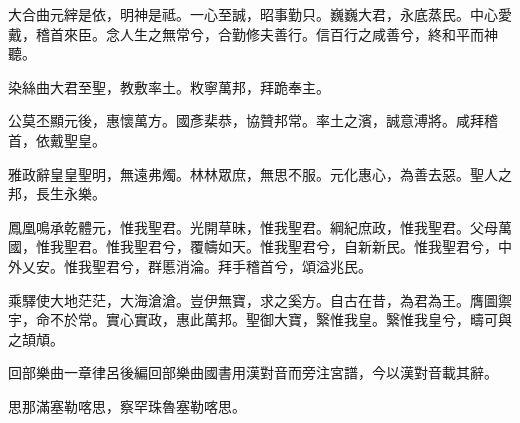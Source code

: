 \begin{pinyinscope}
大合曲元縡是依，明神是祗。一心至誠，昭事勤只。巍巍大君，永底蒸民。中心愛戴，稽首來臣。念人生之無常兮，合勤修夫善行。信百行之咸善兮，終和平而神聽。

染絲曲大君至聖，教敷率土。敉寧萬邦，拜跪奉主。

公莫丕顯元後，惠懷萬方。國彥棐恭，協贊邦常。率土之濱，誠意溥將。咸拜稽首，依戴聖皇。

雅政辭皇皇聖明，無遠弗燭。林林眾庶，無思不服。元化惠心，為善去惡。聖人之邦，長生永樂。

鳳凰鳴承乾體元，惟我聖君。光開草昧，惟我聖君。綱紀庶政，惟我聖君。父母萬國，惟我聖君。惟我聖君兮，覆幬如天。惟我聖君兮，自新新民。惟我聖君兮，中外乂安。惟我聖君兮，群慝消淪。拜手稽首兮，頌溢兆民。

乘驛使大地茫茫，大海滄滄。豈伊無寶，求之奚方。自古在昔，為君為王。膺圖禦宇，命不於常。實心實政，惠此萬邦。聖御大寶，繄惟我皇。繄惟我皇兮，疇可與之頡頏。

回部樂曲一章律呂後編回部樂曲國書用漢對音而旁注宮譜，今以漢對音載其辭。

思那滿塞勒喀思，察罕珠魯塞勒喀思。


\end{pinyinscope}